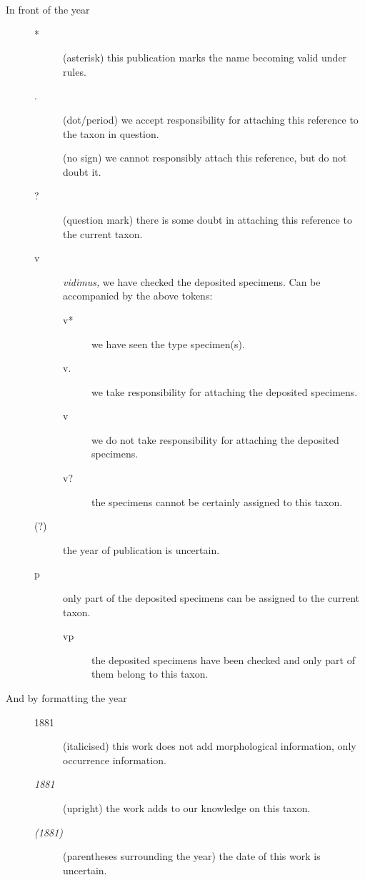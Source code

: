 \documentclass[notuftebib,font=source,UKenglish]{tufte-lualatex}
\begin{document}
\begin{description}
    \item[In front of the year] \par
    \begin{description}
        \item[*] (asterisk) this publication marks the name becoming valid under
             rules.
        \item[.] (dot/period) we accept responsibility for attaching this reference
            to the taxon in question.
        \item[] (no sign) we cannot responsibly attach this reference, but do not
            doubt it.
        \item[?] (question mark) there is some doubt in attaching this reference to
            the current taxon.
        \item[v] \emph{vidimus,} we have checked the deposited specimens. Can be
            accompanied by the above tokens:
            \begin{description}
                \item[v*] we have seen the type specimen(s).
                \item[v.] we take responsibility for attaching the deposited specimens.
                \item[v] we do not take responsibility for attaching the deposited
                    specimens.
                \item[v?] the specimens cannot be certainly assigned to this taxon.
            \end{description}
        \item[(?)] the year of publication is uncertain.
        \item[p] only part of the deposited specimens can be assigned to the current
            taxon.
            \begin{description}
                \item[vp] the deposited specimens have been checked and only part of
                    them belong to this taxon.
            \end{description}
    \end{description}

\item[And by formatting the year] \par
    \begin{description}
        \item[1881] (italicised) this work does not add morphological
            information, only occurrence information.
        \item[\emph{1881}] (upright) the work adds to our knowledge on this taxon.
        \item[\emph{(1881)}] (parentheses surrounding the year) the date of this work is
            uncertain.
    \end{description}
\end{description}
\end{document}
